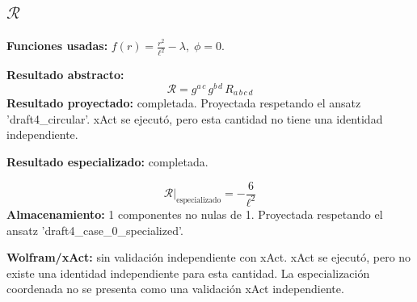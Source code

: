 \documentclass[11pt]{article}
\begin{document}
\subsection*{$ \mathcal{R} $}
\textbf{Funciones usadas:} $ f\!\left(r\right) = \frac{{r}^{2}}{{\ell}^{2}} - \lambda,\;\phi=0 $.\par
\textbf{Resultado abstracto:}
\begin{dmath*}[breakdepth={5}]
\mathcal{R} = g{}^{a\,c}\,g{}^{b\,d}\,R{}_{a\,b\,c\,d}
\end{dmath*}
\textbf{Resultado proyectado:} completada. Proyectada respetando el ansatz 'draft4\_circular'. xAct se ejecutó, pero esta cantidad no tiene una identidad independiente.\par
\textbf{Resultado especializado:} completada.\par
\begin{dmath*}[breakdepth={5}]
\mathcal{R}\big|_{\mathrm{especializado}} = -\frac{6}{{\ell}^{2}}
\end{dmath*}
\textbf{Almacenamiento:} 1 componentes no nulas de 1. Proyectada respetando el ansatz 'draft4\_case\_0\_specialized'.\par
\textbf{Wolfram/xAct:} sin validación independiente con xAct. xAct se ejecutó, pero no existe una identidad independiente para esta cantidad. La especialización coordenada no se presenta como una validación xAct independiente.\par\medskip
{}
\end{document}
